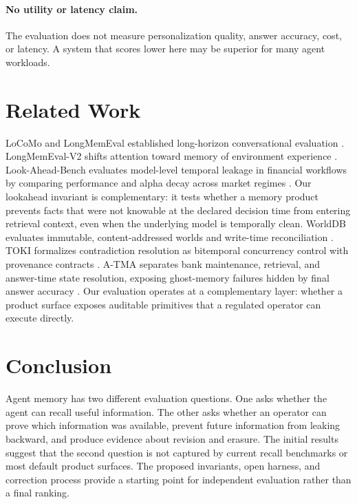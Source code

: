 \documentclass[10pt]{article}
\begin{document}
\paragraph{No utility or latency claim.}
The evaluation does not measure personalization quality, answer accuracy, cost, or
latency. A system that scores lower here may be superior for many agent workloads.

\section{Related Work}

LoCoMo and LongMemEval established long-horizon conversational evaluation
\cite{locomo2024,longmemeval2024}. LongMemEval-V2 shifts attention toward memory of
environment experience \cite{longmemevalv2_2026}. Look-Ahead-Bench evaluates
model-level temporal leakage in financial workflows by comparing performance and
alpha decay across market regimes \cite{lookaheadbench2026}. Our lookahead invariant
is complementary: it tests whether a memory product prevents facts that were not
knowable at the declared decision time from entering retrieval context, even when
the underlying model is temporally clean. WorldDB evaluates immutable,
content-addressed worlds and write-time reconciliation \cite{worlddb2026}. TOKI
formalizes contradiction resolution as bitemporal concurrency control with provenance
contracts \cite{toki2026}. A-TMA separates bank maintenance, retrieval, and answer-time
state resolution, exposing ghost-memory failures hidden by final answer accuracy
\cite{atma2026}. Our evaluation operates at a complementary layer: whether a product
surface exposes auditable primitives that a regulated operator can execute directly.

\section{Conclusion}

Agent memory has two different evaluation questions. One asks whether the agent can
recall useful information. The other asks whether an operator can prove which
information was available, prevent future information from leaking backward, and
produce evidence about revision and erasure. The initial results suggest that the
second question is not captured by current recall benchmarks or most default product
surfaces. The proposed invariants, open harness, and correction process provide a
starting point for independent evaluation rather than a final ranking.



\end{document}
